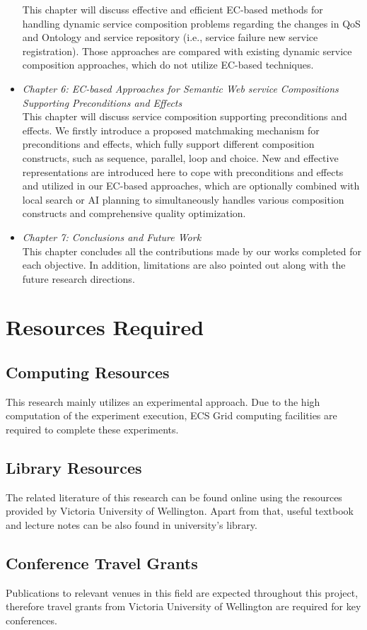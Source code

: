 \begin{itemize}
This chapter will discuss effective and efficient EC-based methods for handling dynamic service composition problems regarding the changes in QoS and Ontology and service repository (i.e., service failure new service registration). Those approaches are compared with existing dynamic service composition approaches, which do not utilize EC-based techniques.
 \item \textit{Chapter 6: EC-based Approaches for Semantic Web service Compositions Supporting Preconditions and Effects}\\
This chapter will discuss service composition supporting preconditions and effects. We firstly introduce a proposed matchmaking mechanism for preconditions and effects, which fully support different composition constructs, such as sequence, parallel, loop and choice. New and effective representations are introduced here to cope with preconditions and effects and utilized in our EC-based approaches, which are optionally combined with local search or AI planning to simultaneously handles various composition constructs and comprehensive quality optimization. 
\item \textit{Chapter 7: Conclusions and Future Work}\\
This chapter concludes all the contributions made by our works completed for each objective. In addition, limitations are also pointed out along with the future research directions.
\end{itemize}


\section{Resources Required}

\subsection{Computing Resources}
This research mainly utilizes an experimental approach. Due to the high computation of the experiment execution, ECS Grid computing facilities are required to complete these experiments.

\subsection{Library Resources}
The related literature of this research can be found online using the resources provided by Victoria University of Wellington. Apart from that, useful textbook and lecture notes can be also found in university's library.

\subsection{Conference Travel Grants}
Publications to relevant venues in this field are expected throughout this project, therefore travel grants from Victoria University of Wellington are required for key conferences.